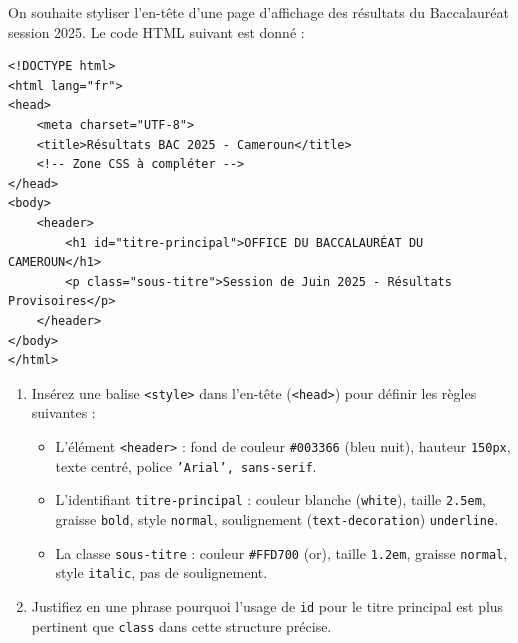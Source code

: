 \documentclass[11pt]{article}
\begin{document}
\begin{exercice}
On souhaite styliser l'en-tête d'une page d'affichage des résultats du Baccalauréat session 2025. Le code HTML suivant est donné :
\begin{verbatim}
<!DOCTYPE html>
<html lang="fr">
<head>
    <meta charset="UTF-8">
    <title>Résultats BAC 2025 - Cameroun</title>
    <!-- Zone CSS à compléter -->
</head>
<body>
    <header>
        <h1 id="titre-principal">OFFICE DU BACCALAURÉAT DU CAMEROUN</h1>
        <p class="sous-titre">Session de Juin 2025 - Résultats Provisoires</p>
    </header>
</body>
</html>
\end{verbatim}
\begin{enumerate}
    \item Insérez une balise \texttt{<style>} dans l'en-tête (\texttt{<head>}) pour définir les règles suivantes :
    \begin{itemize}
        \item L'élément \texttt{<header>} : fond de couleur \texttt{\#003366} (bleu nuit), hauteur \texttt{150px}, texte centré, police \texttt{'Arial', sans-serif}.
        \item L'identifiant \texttt{titre-principal} : couleur blanche (\texttt{white}), taille \texttt{2.5em}, graisse \texttt{bold}, style \texttt{normal}, soulignement (\texttt{text-decoration}) \texttt{underline}.
        \item La classe \texttt{sous-titre} : couleur \texttt{\#FFD700} (or), taille \texttt{1.2em}, graisse \texttt{normal}, style \texttt{italic}, pas de soulignement.
    \end{itemize}
    \item Justifiez en une phrase pourquoi l'usage de \texttt{id} pour le titre principal est plus pertinent que \texttt{class} dans cette structure précise.
\end{enumerate}
\end{exercice}
\end{document}

